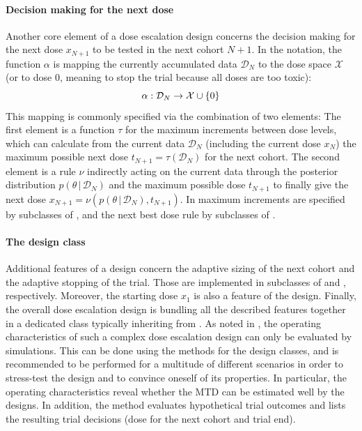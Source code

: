 \documentclass[article]{jss}\usepackage[]{graphicx}\usepackage[]{color}
\newcommand{\given}{\,\vert\,}
\begin{document}
\paragraph{Decision making for the next dose}
\label{sec:frame:decision-making}
%
Another core element of a dose escalation design concerns the decision making
for the next dose $x_{N+1}$ to be tested in the next cohort $N+1$. In the
\cite{Thall2010} notation, the function $\alpha$ is mapping the currently
accumulated data $\mathcal{D}_{N}$ to the dose space $\mathcal{X}$ (or to dose
$0$, meaning to stop the trial because all doses are too toxic):
\begin{equation}
\alpha: {\cal D}_{N} \rightarrow \mathcal{X} \cup \{0\}
\end{equation}
This mapping is commonly specified via the combination of two elements:
The first element is a function $\tau$ for the maximum increments between dose
levels, which can calculate from the current data $\mathcal{D}_{N}$ (including the
current dose $x_{N}$) the maximum possible next dose $t_{N+1}=\tau(\mathcal{D}_{N})$ 
for the next cohort. The second element is a rule $\nu$ indirectly
acting on the current data through the posterior distribution $p(\theta \given
\mathcal{D}_{N})$ and the maximum possible dose $t_{N+1}$ to finally give the
next dose $x_{N+1} = \nu(p(\theta \given \mathcal{D}_{N}), t_{N+1})$.
%
In  maximum increments are specified by subclasses of
, and the next best dose rule by subclasses of .

\paragraph{The design class}
\label{sec:frame:design}
%
Additional features of a design concern the adaptive sizing of the next
cohort and the adaptive stopping of the trial. Those are implemented in
subclasses of  and , respectively.
Moreover, the starting dose $x_{1}$ is also a feature of the design.
%
Finally, the overall dose escalation design is bundling all the described
features together in a dedicated class typically inheriting from .
%
As noted in \cite{Thall2010}, the operating characteristics of such a complex
dose escalation design can only be evaluated by simulations. This can be done
using the  methods for the design classes, and is recommended to
be performed for a multitude of different scenarios in order to stress-test the
design and to convince oneself of its properties.
%
In particular, the operating characteristics reveal whether the MTD can be 
estimated well by the designs. 
%
In addition, the  method evaluates hypothetical trial outcomes and lists the
resulting trial decisions (dose for the next cohort and trial end).
\end{document}
